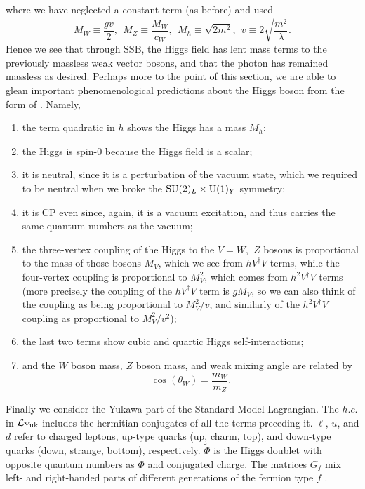 where we have neglected a constant term (as before) and used
\begin{equation}
  M_W\equiv\frac{gv}{2},\ \ M_Z\equiv\frac{M_W}{c_W},\ \
  M_h\equiv\sqrt{2m^2},\ \ v\equiv 2\sqrt{\frac{m^2}{\lambda}}.
\end{equation}
Hence we see that through SSB, the Higgs field has 
lent mass terms to the previously massless weak vector bosons, and that the 
photon has remained massless as desired. Perhaps more to the point of this 
section, we are able to glean important phenomenological predictions about the 
Higgs boson from the form of \equatref{eq:LagrHiggs}. Namely,
\begin{enumerate}
  \item the term quadratic in $h$ shows the Higgs has a mass $M_h$;
  \item the Higgs is spin-0 because the Higgs field is a scalar;
  \item it is neutral, since it is a perturbation of the vacuum state,
        which we required to be neutral when we broke the 
        $\operatorname{SU}(2)_{L}\times\operatorname{U}(1)_{Y}$ symmetry;
  \item it is CP even since, again, it is a vacuum excitation, and thus 
        carries the same quantum numbers as the vacuum;
  \item the three-vertex coupling of the Higgs to the $V=W,$ $Z$ bosons 
        is proportional to the mass of those bosons $M_V$, which we see from 
        $hV^{\dagger}V$ terms, while the four-vertex coupling is proportional
        to $M_{V}^2$, which comes from $h^{2}V^{\dagger}V$ terms (more
        precisely the coupling of the $hV^{\dagger}V$ term is $gM_{V}$, so we
        can also think of the coupling as being proportional to $M_{V}^{2}/v$,
        and similarly of the $h^{2}V^{\dagger}V$ coupling as proportional
        to $M_{V}^{2}/v^{2}$); 
        \vspace{9mm}
  \item the last two terms show cubic and quartic Higgs self-interactions;
  \item and the $W$ boson mass, $Z$ boson mass, and weak mixing angle are 
        related by $$\cos(\theta_W)=\frac{m_W}{m_Z}.$$
\end{enumerate}

Finally we consider the Yukawa part of the Standard Model Lagrangian. The
$h.c.$ in $\mathcal{L}_{\rm Yuk}$ includes the hermitian conjugates of all the terms
preceding it. $\ell$, $u$, and $d$ refer to charged leptons, up-type quarks
(up, charm, top), and down-type quarks (down, strange, bottom), respectively.
$\widetilde{\Phi}$ is the Higgs doublet with opposite quantum numbers as
$\Phi$ and conjugated charge. The matrices $G_f$ mix left- and right-handed 
parts of different generations of the fermion type $f$ 
\cite{dittmaier_higgs_2013}. 

